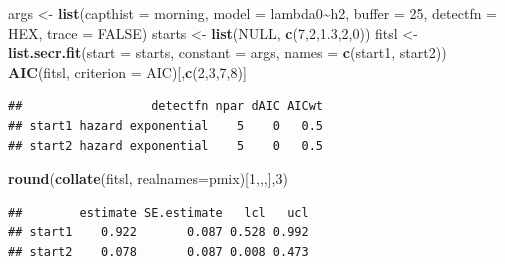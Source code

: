 \documentclass[
]{book}
\newenvironment{Shaded}{\begin{snugshade}}{\end{snugshade}}
\newcommand{\AttributeTok}[1]{\textcolor[rgb]{0.13,0.29,0.53}{#1}}
\newcommand{\ConstantTok}[1]{\textcolor[rgb]{0.56,0.35,0.01}{#1}}
\newcommand{\DecValTok}[1]{\textcolor[rgb]{0.00,0.00,0.81}{#1}}
\newcommand{\FloatTok}[1]{\textcolor[rgb]{0.00,0.00,0.81}{#1}}
\newcommand{\FunctionTok}[1]{\textcolor[rgb]{0.13,0.29,0.53}{\textbf{#1}}}
\newcommand{\NormalTok}[1]{#1}
\newcommand{\OtherTok}[1]{\textcolor[rgb]{0.56,0.35,0.01}{#1}}
\newcommand{\SpecialCharTok}[1]{\textcolor[rgb]{0.81,0.36,0.00}{\textbf{#1}}}
\newcommand{\StringTok}[1]{\textcolor[rgb]{0.31,0.60,0.02}{#1}}
\begin{document}
\begin{Shaded}
\begin{Highlighting}[]
\NormalTok{args }\OtherTok{\textless{}{-}} \FunctionTok{list}\NormalTok{(}\AttributeTok{capthist =}\NormalTok{ morning, }\AttributeTok{model =}\NormalTok{ lambda0}\SpecialCharTok{\textasciitilde{}}\NormalTok{h2, }\AttributeTok{buffer =} \DecValTok{25}\NormalTok{, }
    \AttributeTok{detectfn =} \StringTok{\textquotesingle{}HEX\textquotesingle{}}\NormalTok{, }\AttributeTok{trace =} \ConstantTok{FALSE}\NormalTok{)}
\NormalTok{starts }\OtherTok{\textless{}{-}} \FunctionTok{list}\NormalTok{(}\ConstantTok{NULL}\NormalTok{, }\FunctionTok{c}\NormalTok{(}\DecValTok{7}\NormalTok{,}\DecValTok{2}\NormalTok{,}\FloatTok{1.3}\NormalTok{,}\DecValTok{2}\NormalTok{,}\DecValTok{0}\NormalTok{))}
\NormalTok{fitsl }\OtherTok{\textless{}{-}} \FunctionTok{list.secr.fit}\NormalTok{(}\AttributeTok{start =}\NormalTok{ starts, }\AttributeTok{constant =}\NormalTok{ args, }
    \AttributeTok{names =} \FunctionTok{c}\NormalTok{(}\StringTok{\textquotesingle{}start1\textquotesingle{}}\NormalTok{, }\StringTok{\textquotesingle{}start2\textquotesingle{}}\NormalTok{))}
\FunctionTok{AIC}\NormalTok{(fitsl, }\AttributeTok{criterion =} \StringTok{\textquotesingle{}AIC\textquotesingle{}}\NormalTok{)[,}\FunctionTok{c}\NormalTok{(}\DecValTok{2}\NormalTok{,}\DecValTok{3}\NormalTok{,}\DecValTok{7}\NormalTok{,}\DecValTok{8}\NormalTok{)]}
\end{Highlighting}
\end{Shaded}

\begin{verbatim}
##                  detectfn npar dAIC AICwt
## start1 hazard exponential    5    0   0.5
## start2 hazard exponential    5    0   0.5
\end{verbatim}

\begin{Shaded}
\begin{Highlighting}[]
\FunctionTok{round}\NormalTok{(}\FunctionTok{collate}\NormalTok{(fitsl, }\AttributeTok{realnames=}\StringTok{\textquotesingle{}pmix\textquotesingle{}}\NormalTok{)[}\DecValTok{1}\NormalTok{,,,],}\DecValTok{3}\NormalTok{)}
\end{Highlighting}
\end{Shaded}

\begin{verbatim}
##        estimate SE.estimate   lcl   ucl
## start1    0.922       0.087 0.528 0.992
## start2    0.078       0.087 0.008 0.473
\end{verbatim}
\end{document}
